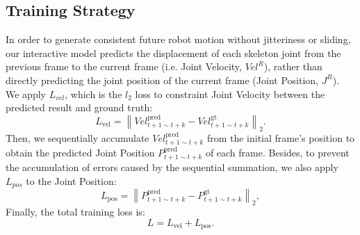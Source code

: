 
\subsection{Training Strategy}
In order to generate consistent future robot motion without jitteriness or sliding, our interactive model predicts the displacement of each skeleton joint from the previous frame to the current frame (i.e. Joint Velocity, $Vel^R$), rather than directly predicting the joint position of the current frame (Joint Position, $J^R$). 
We apply $L_{vel}$, which is the $l_2$ loss to constraint Joint Velocity between the predicted result and ground truth:
\begin{equation}
    L_{\text{vel}}  = \left\| Vel_{t+1 \sim t+k}^{\text{pred}}- Vel_{t+1 \sim t+k}^{\text{gt}} \right\|_2.
\end{equation}
Then, we sequentially accumulate $Vel_{t+1 \sim t+k}^{\text{pred}}$ from the initial frame's position to obtain the predicted Joint Position $P_{t+1 \sim t+k}^{\text{pred}}$ of each frame.
Besides, to prevent the accumulation of errors caused by the sequential summation, we also apply $L_{pos}$ to the Joint Position:
\begin{equation}
    L_{\text{pos}}  = \left\| P_{t+1 \sim t+k}^{\text{pred}} - P_{t+1 \sim t+k}^{\text{gt}} \right\|_2,
\end{equation}
Finally, the total training loss is:
\begin{equation}
    L = L_{\text{vel}} + L_{\text{pos}}.
\end{equation}









